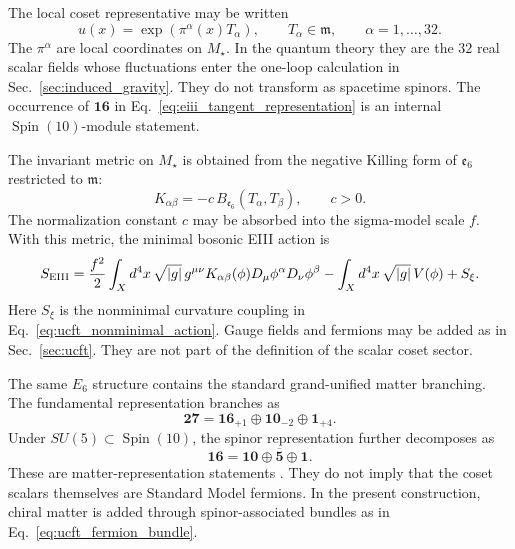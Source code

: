 \documentclass[aps,prd,preprint,longbibliography,nofootinbib,superscriptaddress,floatfix]{revtex4-2}
\newcommand{\Spin}{\operatorname{Spin}}
\begin{document}
The local coset representative may be written
\begin{equation}
    u(x)
    =
    \exp\!\left(\pi^\alpha(x)T_\alpha\right),
    \qquad
    T_\alpha\in\mathfrak m,
    \qquad
    \alpha=1,\ldots,32 .
    \label{eq:eiii_local_rep}
\end{equation}
The \(\pi^\alpha\) are local coordinates on \(M_\star\). In the quantum theory
they are the \(32\) real scalar fields whose fluctuations enter the one-loop
calculation in Sec.~\ref{sec:induced_gravity}. They do not transform as
spacetime spinors. The occurrence of \(\mathbf{16}\) in
Eq.~\eqref{eq:eiii_tangent_representation} is an internal
\(\Spin(10)\)-module statement.

The invariant metric on \(M_\star\) is obtained from the negative Killing form
of \(\mathfrak e_6\) restricted to \(\mathfrak m\):
\begin{equation}
    K_{\alpha\beta}
    =
    -c\,B_{\mathfrak e_6}(T_\alpha,T_\beta),
    \qquad
    c>0 .
    \label{eq:eiii_metric}
\end{equation}
The normalization constant \(c\) may be absorbed into the sigma-model scale
\(f\). With this metric, the minimal bosonic EIII action is
\begin{equation}
    S_{\rm EIII}
    =
    \frac{f^2}{2}
    \int_X d^4x\,\sqrt{|g|}
    \,
    g^{\mu\nu}
    K_{\alpha\beta}(\phi)
    D_\mu\phi^\alpha D_\nu\phi^\beta
    -
    \int_X d^4x\,\sqrt{|g|}\,V(\phi)
    +
    S_\xi .
    \label{eq:eiii_minimal_action}
\end{equation}
Here \(S_\xi\) is the nonminimal curvature coupling in
Eq.~\eqref{eq:ucft_nonminimal_action}. Gauge fields and fermions may be added
as in Sec.~\ref{sec:ucft}. They are not part of the definition of the scalar
coset sector.

The same \(E_6\) structure contains the standard grand-unified matter
branching. The fundamental representation branches as
\begin{equation}
    \mathbf{27}
    =
    \mathbf{16}_{+1}
    \oplus
    \mathbf{10}_{-2}
    \oplus
    \mathbf{1}_{+4}.
    \label{eq:eiii_27_branching}
\end{equation}
Under \(SU(5)\subset\Spin(10)\), the spinor representation further decomposes
as
\begin{equation}
    \mathbf{16}
    =
    \mathbf{10}
    \oplus
    \overline{\mathbf 5}
    \oplus
    \mathbf 1 .
    \label{eq:eiii_16_su5_branching}
\end{equation}
These are matter-representation statements \cite{GeorgiSO10,FritzschMinkowski,
Slansky}. They do not imply that the coset scalars themselves are Standard
Model fermions. In the present construction, chiral matter is added through
spinor-associated bundles as in Eq.~\eqref{eq:ucft_fermion_bundle}.
\end{document}
